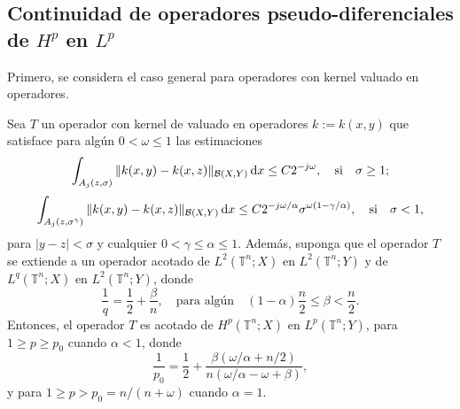 \subsection{Continuidad de operadores pseudo-diferenciales de $H^p$ en $L^p$}
\label{section:Hp-Lp}
Primero, se considera el caso general para operadores con kernel valuado en operadores. 
\begin{theorem}
	\label{theo:operator-kernel-2j}
	Sea $T$ un operador con kernel de valuado en operadores $k:=k(x,y)$ que satisface para algún $0<\omega\leq1$ las estimaciones
	\begin{equation}
		\int_{A_j(z, \sigma)} \| k(x, y) - k(x, z)\|_{\mathcal{B}(X, Y)} \mathop{}\!\mathrm{d} x \leq C2^{-j\omega}, \quad \text{si} \quad \sigma\geq1;
	\end{equation}
	\begin{equation}
		\int_{A_j(z, \sigma^\gamma)} \| k(x, y) - k(x, z)\|_{\mathcal{B}(X,Y)} \mathop{}\!\mathrm{d} x \leq C2^{-j\omega/\alpha}\sigma^{\omega(1-\gamma/\alpha)}, \quad \text{si} \quad \sigma<1,
	\end{equation}
	para $|y-z|<\sigma$ y cualquier $0<\gamma\leq\alpha\leq1$. Además, suponga que el operador $T$ se extiende a un operador acotado de $L^2(\mathbb{T}^n; X)$ en $L^2(\mathbb{T}^n; Y)$ y de $L^q(\mathbb{T}^n; X)$ en $L^2(\mathbb{T}^n; Y)$, donde 
	\begin{equation}
		\frac{1}{q} = \frac{1}{2} + \frac{\beta}{n}, \quad \text{para algún} \quad (1-\alpha)\frac{n}{2} \leq \beta < \frac{n}{2}.
	\end{equation}
	Entonces, el operador $T$ es acotado de $H^p(\mathbb{T}^n; X)$ en $L^p(\mathbb{T}^n;Y)$, para $1\geq p \geq p_0$ cuando $\alpha<1$, donde
	\begin{equation*}
		\frac{1}{p_0} = \frac{1}{2}+\frac{\beta(\omega/\alpha + n/2)}{n(\omega/\alpha-\omega+\beta)},
	\end{equation*}  
	y para $1\geq p > p_0=n/(n+\omega)$ cuando $\alpha=1$.
\end{theorem}
